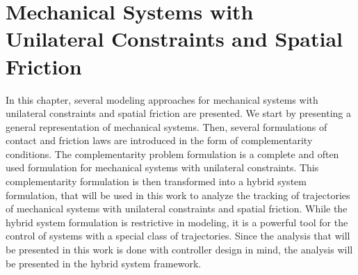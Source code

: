 \documentclass[../DC2019003Bouma.tex]{subfiles}
\begin{document}
\graphicspath{{02_Material/img/}}
\renewcommand{\chaptermark}[1]{\markboth{\thechapter.\ #1}{}}
\renewcommand{\sectionmark}[1]{\markright{#1}{}}
\pagestyle{fancyreport}
\cleartooddpage
\pagestyle{fancyreport}
\chapter{Mechanical Systems with Unilateral Constraints and Spatial Friction}\label{ch:model}
%
%
%
%
%
%
%
%
%
%
%
%
%
%
%
%
%
%
%
%
In this chapter, several modeling approaches for mechanical systems with unilateral constraints and spatial friction are presented. We start by presenting a general representation of mechanical systems. Then, several formulations of contact and friction laws are introduced in the form of complementarity conditions. The complementarity problem formulation is a complete and often used formulation for mechanical systems with unilateral constraints. This complementarity formulation is then transformed into a hybrid system formulation, that will be used in this work to analyze the tracking of trajectories of mechanical systems with unilateral constraints and spatial friction. While the hybrid system formulation is restrictive in modeling, it is a powerful tool for the control of systems with a special class of trajectories. Since the analysis that will be presented in this work is done with controller design in mind, the analysis will be presented in the hybrid system framework.
\end{document}
